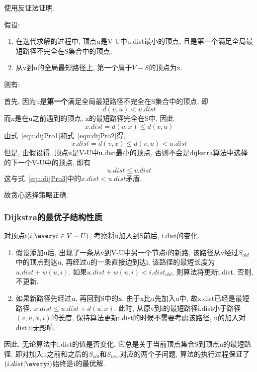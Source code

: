 使用反证法证明.\par

假设:
\begin{enumerate}
	\item 在迭代求解的过程中, 顶点u是V-U中u.dist最小的顶点,
	      且是第一个满足全局最短路径不完全在S集合中的顶点;
	\item 从v到u的全局最短路径上, 第一个属于$V-S$的顶点为x.
\end{enumerate}

则有:\par
首先, 因为u是\textbf{第一个}满足全局最短路径不完全在S集合中的顶点, 即
\begin{equation}
	d(v, u) < u.dist
	\label{equ:dijPro1}
\end{equation}
而x是在u之前遇到的顶点, x的最短路径完全在S中, 因此
\begin{equation}
	x.dist = d(v, x) \leq d(v, u)
	\label{equ:dijPro2}
\end{equation}
由式~\ref{equ:dijPro1}和式~\ref{equ:dijPro2}得,
\begin{equation}
	x.dist = d(v, x) \leq d(v, u) < u.dist
	\label{eq:dijPro3}
\end{equation}
但是, 由假设得, 顶点u是V-U中u.dist最小的顶点,
否则不会是dijkstra算法中选择的下一个V-U中的顶点, 即有
\begin{equation}
	u.dist \leq v.dist
\end{equation}
这与式~\ref{equ:dijPro3}中的$x.dist < u.dist$矛盾.\par
故贪心选择策略正确.

\subsubsection{Dijkstra的最优子结构性质}
对顶点i$(i | \every i \in V-U)$, 考察将u加入到S前后, i.dist的变化.
\begin{enumerate}
	\item 假设添加u后, 出现了一条从v到V-U中另一个节点i的新路,
	      该路径从v经过$S_{old}$中的顶点到达u, 再经过u的一条直接边到达i,
	      该路径的最短长度为$u.dist + w(u, i)$. 如果$u.dist+w(u,i) <
		      i.dist_{old}$, 则算法将更新i.dist. 否则, 不更新.
	\item 如果新路径先经过u, 再回到S中的x. 由于x比u先加入u中,
	      故x.dist已经是最短路径, $x.dist \leq u.dist + d(u, x)$. 此时,
	      从原v到i的最短路径i.dist小于路径$(v,u,x,i)$的长度,
	      保持算法更新i.dist的时候不需要考虑该路径, u的加入对dist[i]无影响.
\end{enumerate}
因此, 无论算法中i.dist的值是否变化, 它总是关于当前顶点集合S到顶点u的最短路径.
即对加入u之前和之后的$S_{old}$和$S_{new}$对应的两个子问题,
算法的执行过程保证了$(i.dist | \every i)$始终是i的最优解.
